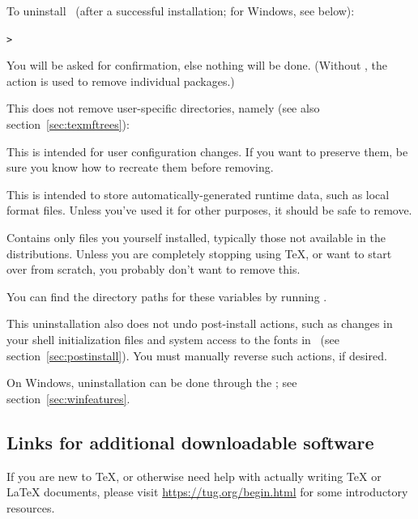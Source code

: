 \documentclass[12pt]{article}
\begin{document}
To uninstall \TL\ (after a successful installation; for Windows, see
below):

\begin{alltt}
> 
\end{alltt}

You will be asked for confirmation, else nothing will be done.
(Without , the  action is used to remove
individual packages.)

This does not remove user-specific directories, namely (see also
section~\ref{sec:texmftrees}):

\begin{ttdescription}
\item [TEXMFCONFIG] This is intended for user configuration changes. 
If you want to preserve them, be sure you know how to recreate them
before removing.

\item [TEXMFVAR] This is intended to store automatically-generated
runtime data, such as local format files. Unless you've used it for
other purposes, it should be safe to remove.

\item[TEXMFHOME] Contains only files you yourself installed, typically
those not available in the distributions. Unless you are completely
stopping using \TeX, or want to start over from scratch, you probably
don't want to remove this.

\end{ttdescription}

\noindent You can find the directory paths for these variables by
running .

This  uninstallation also does not undo post-install
actions, such as  changes in your shell initialization
files and system access to the fonts in \TL\ (see
section~\ref{sec:postinstall}). You must manually reverse such actions,
if desired.

On Windows, uninstallation can be done through the \GUI; see
section~\ref{sec:winfeatures}.


\subsection{Links for additional downloadable software}

If you are new to \TeX{}, or otherwise need help with actually writing
\TeX{} or \LaTeX{} documents, please visit
\url{https://tug.org/begin.html} for some introductory resources.
\end{document}
